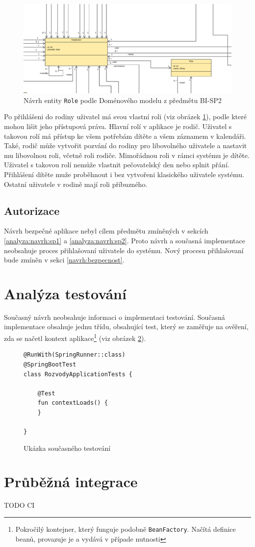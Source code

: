         \begin{figure}\centering
	        \includegraphics[width=1.0\textwidth]{pdfs/Role1}
	        \caption[Návrh \texttt{Role}]{Návrh entity \texttt{Role} podle Doménového modelu z předmětu BI-SP2}\label{image:Role1}
        \end{figure}
        Po přihlášeni do rodiny uživatel má svou vlastní roli (viz obrázek \ref{image:Role1}), podle které mohou lišit jeho přístupová práva. Hlavní rolí v aplikace je rodič. Uživatel s takovou rolí má přístup ke všem potřebám dítěte a všem záznamem v kalendáři. Také, rodič může vytvořit pozvání do rodiny pro libovolného uživatele a nastavit mu libovolnou roli, včetně roli rodiče. Mimořádnou roli v rámci systému je dítěte. Uživatel s takovou rolí nemůže vlastnit pečovatelský den nebo splnit přání. Přihlášení dítěte muže proběhnout i bez vytvořeni klasického uživatele systému. Ostatní uživatele v rodině mají roli příbuzného.
    
    \subsection{Autorizace}
        Návrh bezpečné aplikace nebyl cílem předmětu zmíněných v sekcích \ref{analyza:navrh:sp1} a \ref{analyza:navrh:sp2}. Proto návrh a současná implementace neobsahuje proces přihlašovaní uživatele do systému. Nový procesu přihlašovaní bude zmíněn v sekci \ref{navrh:bezpecnost}.
        
\section{Analýza testování}\label{analyza:testovani}
    Současný návrh neobsahuje informaci o implementaci testování. Současná implementace obsahuje jednu třídu, obsahující test, který se zaměřuje na ověření, zda se načetl {kontext aplikace}\footnote{Pokročilý kontejner, který funguje podobně \texttt{BeanFactory}. Načítá definice beanů, provazuje je a vydává v případe nutnosti} (viz obrázek \ref{code:test-context-loads1}).
    \begin{figure}
    \begin{verbatim}
@RunWith(SpringRunner::class)
@SpringBootTest
class RozvodyApplicationTests {

    @Test
    fun contextLoads() {
    }

}
        \end{verbatim}
        \caption{Ukázka současného testování} 
        \label{code:test-context-loads1}
        \end{figure}
\section{Průběžná integrace}
    TODO CI
   
